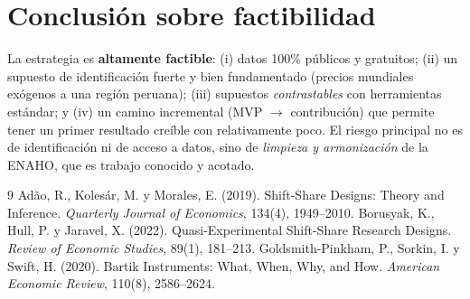 \documentclass[11pt]{article}
\begin{document}
\section{Conclusión sobre factibilidad}
La estrategia es \textbf{altamente factible}: (i) datos 100\% públicos y gratuitos; (ii) un
supuesto de identificación fuerte y bien fundamentado (precios mundiales exógenos a una región
peruana); (iii) supuestos \emph{contrastables} con herramientas estándar; y (iv) un camino
incremental (MVP $\to$ contribución) que permite tener un primer resultado creíble con
relativamente poco. El riesgo principal no es de identificación ni de acceso a datos, sino de
\emph{limpieza y armonización} de la ENAHO, que es trabajo conocido y acotado.

\begin{thebibliography}{9}
\setlength{\itemsep}{2pt}
Adão, R., Kolesár, M. y Morales, E. (2019). Shift-Share Designs: Theory and Inference.
\textit{Quarterly Journal of Economics}, 134(4), 1949--2010.
Borusyak, K., Hull, P. y Jaravel, X. (2022). Quasi-Experimental Shift-Share Research Designs.
\textit{Review of Economic Studies}, 89(1), 181--213.
Goldsmith-Pinkham, P., Sorkin, I. y Swift, H. (2020). Bartik Instruments: What, When, Why, and
How. \textit{American Economic Review}, 110(8), 2586--2624.
\end{thebibliography}
\end{document}
